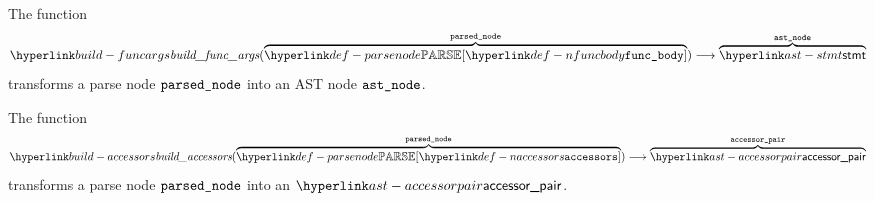 \begin{mathpar}
\end{mathpar}

\hypertarget{build-funcbody}{}
The function
\[
\buildfuncargs(\overname{\parsenode{\Nfuncbody}}{\vparsednode}) \aslto
  \overname{\stmt}{\vastnode}
\]
transforms a parse node $\vparsednode$ into an AST node $\vastnode$.

\begin{mathpar}
\end{mathpar}

\hypertarget{build-accessors}{}
The function
\[
\buildaccessors(\overname{\parsenode{\Naccessors}}{\vparsednode}) \aslto
  \overname{\accessorpair}{\vaccessorpair}
\]
transforms a parse node $\vparsednode$ into an $\accessorpair$.

\begin{mathpar}
\end{mathpar}

